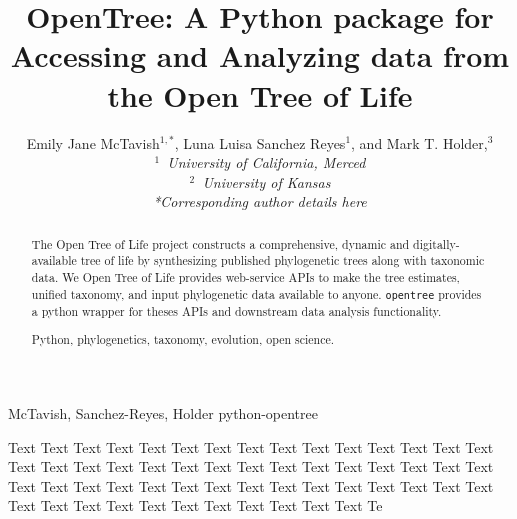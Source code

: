 \documentclass[oupdraft]{sysbio_sse}
\begin{document}
\title{OpenTree: A Python package for Accessing and Analyzing data from the Open Tree of Life}

\author{Emily Jane McTavish$^{1,\ast}$, Luna Luisa Sanchez Reyes$^{1}$, and
Mark T. Holder,$^{3}$\\[4pt]
\textit{$^{1}$~University of California, Merced}
\\
\textit{$^{2}$~University of Kansas}
\\[2pt]
\textit{*Corresponding author details here}}

\markboth%
{McTavish, Sanchez-Reyes, Holder}
{python-opentree}

\maketitle

\begin{abstract}
{The Open Tree of Life project constructs a comprehensive, dynamic and digitally-available tree of life by synthesizing published phylogenetic trees along with taxonomic data.
We Open Tree of Life provides web-service APIs to make the tree estimates, unified taxonomy, and input phylogenetic data available to anyone.
\texttt{opentree} provides a python wrapper for theses APIs and downstream data analysis functionality.
}

{Python, phylogenetics, taxonomy, evolution, open science.}
\end{abstract}
\newline

Text Text Text Text Text Text Text Text Text Text Text Text Text Text Text Text Text Text Text Text Text Text Text Text Text Text Text Text Text Text Text Text Text Text Text Text Text Text Text Text Text Text Text Text Text Text Text Text Text Text Text Text Text Text Text Text Te
\bigskip
\end{document}
